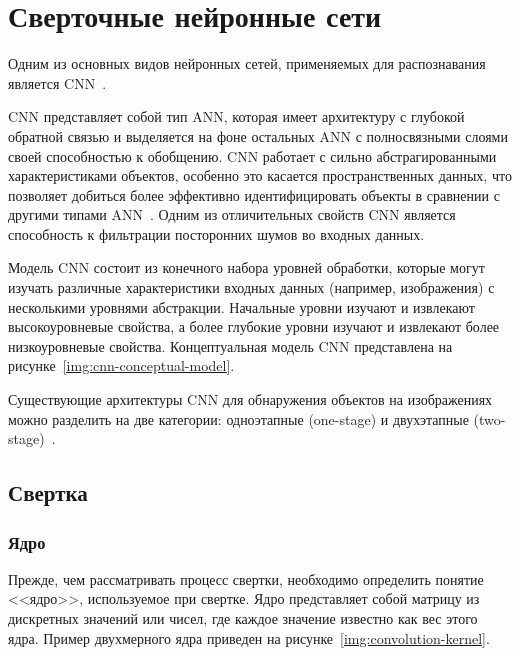 \section{Сверточные нейронные сети}

Одним из основных видов нейронных сетей, применяемых для распознавания является CNN~\cite{cnn}.

CNN представляет собой тип ANN, которая имеет архитектуру с глубокой обратной связью и выделяется на фоне остальных ANN с полносвязными слоями своей способностью к обобщению. CNN работает с сильно абстрагированными характеристиками объектов, особенно это касается пространственных данных, что позволяет добиться более эффективно идентифицировать объекты в сравнении с другими типами ANN~\cite{cnn}. Одним из отличительных свойств CNN является способность к фильтрации посторонних шумов во входных данных.

Модель CNN состоит из конечного набора уровней обработки, которые могут изучать различные характеристики входных данных (например, изображения) с несколькими уровнями абстракции. Начальные уровни изучают и извлекают высокоуровневые свойства, а более глубокие уровни изучают и извлекают более низкоуровневые свойства. Концептуальная модель CNN представлена на рисунке~\ref{img:cnn-conceptual-model}.


Существующие архитектуры CNN для обнаружения объектов на изображениях можно разделить на две категории: одноэтапные (one-stage) и двухэтапные (two-stage)~\cite{review-on-one-stage-object-detection}.    

\subsection{Свертка}

\subsubsection*{Ядро}

Прежде, чем рассматривать процесс свертки, необходимо определить понятие <<ядро>>, используемое при свертке. Ядро представляет собой матрицу из дискретных значений или чисел, где каждое значение известно как вес этого ядра. Пример двухмерного ядра приведен на рисунке~\ref{img:convolution-kernel}.


